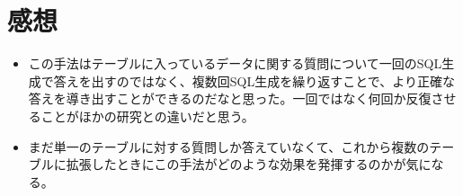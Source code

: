 \documentclass[dvipdfmx,uplatex]{jsarticle}
\theoremstyle{remark}
\newenvironment{kansou}{
    \begin{tcolorbox}[
        colframe=brown,
        colback=brown!10!white,
        colbacktitle=brown!40!white,
        coltitle=black,fonttitle=\bfseries
    ]
}{
    \end{tcolorbox}
}
\begin{document}
\section{感想}
\begin{kansou}
\begin{itemize}
  \item この手法はテーブルに入っているデータに関する質問について一回のSQL生成で答えを出すのではなく、複数回SQL生成を繰り返すことで、より正確な答えを導き出すことができるのだなと思った。一回ではなく何回か反復させることがほかの研究との違いだと思う。
  \item まだ単一のテーブルに対する質問しか答えていなくて、これから複数のテーブルに拡張したときにこの手法がどのような効果を発揮するのかが気になる。
\end{itemize}
\end{kansou}



\end{document}
